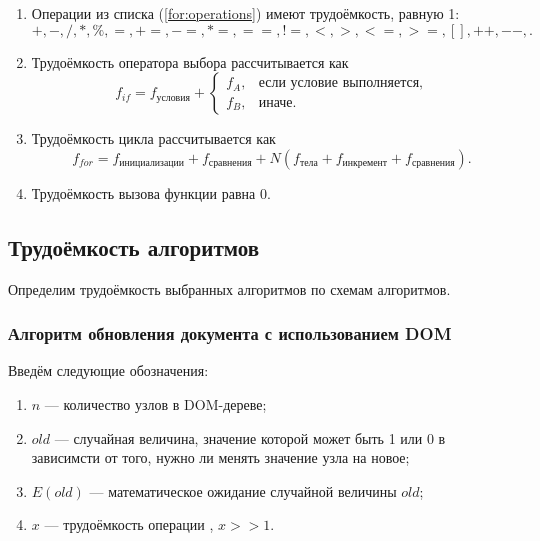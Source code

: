 \begin{enumerate}[label=\arabic*)]
	\item Операции из списка (\ref{for:operations}) имеют трудоёмкость, равную 1:
	\begin{equation}
		\label{for:operations}
		+, -, /, *, \%, =, +=, -=, *=, ==, !=, <, >, <=, >=, [], ++, {-}-, . 
	\end{equation}
	\item Трудоёмкость оператора выбора  рассчитывается как
	\begin{equation}
		\label{for:if}
		f_{if} = f_{\text{условия}} +
		\begin{cases}
			f_A, & \text{если условие выполняется,}\\
			f_B, & \text{иначе.}
		\end{cases}
	\end{equation}
	\item Трудоёмкость цикла рассчитывается как
	\begin{equation}
		\label{for:cycle}
		f_{for} = f_{\text{инициализации}} + f_{\text{сравнения}} + N(f_{\text{тела}} + f_{\text{инкремент}} + f_{\text{сравнения}}).
	\end{equation}
	\item Трудоёмкость вызова функции равна 0.
\end{enumerate}


\subsection{Трудоёмкость алгоритмов}

Определим трудоёмкость выбранных алгоритмов по схемам алгоритмов.

\subsubsection{Алгоритм обновления документа с использованием DOM}

Введём следующие обозначения:
\begin{enumerate}[label=\arabic*)]
	\item $n$ --- количество узлов в DOM-дереве;
	\item $old$ --- случайная величина, значение которой может быть 1 или 0 в зависимсти от того, нужно ли менять значение узла на новое;
	\item $E(old)$ --- математическое ожидание случайной величины $old$;
	\item $x$ --- трудоёмкость операции , $x >> 1$.
\end{enumerate}

